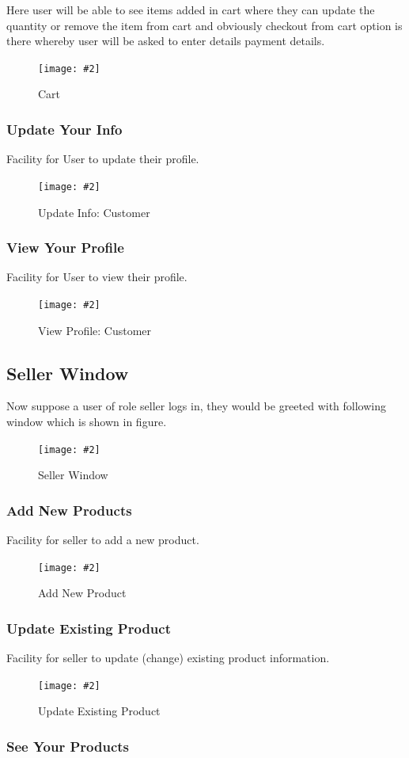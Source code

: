 \documentclass[a4paper,12pt]{article}
\newcommand{\iph}[2]{
    \texttt{[image: \#2]}
}
\newcommand{\dph}[3]{
\begin{figure}[H]
  \centering
  \iph{#1}{#2}
  \caption{#3}
\end{figure}
}
\begin{document}
Here user will be able to see items added in cart where they can update the quantity or remove the item from cart and obviously checkout from cart option is there whereby user will be asked to enter details payment details.

\dph{0.99}{cart}{Cart}

\subsubsection{Update Your Info}

Facility for User to update their profile.

\dph{0.99}{uppcust}{Update Info: Customer}

\subsubsection{View Your Profile}

Facility for User to view their profile.

\dph{0.79}{pcust}{View Profile: Customer}


\subsection{Seller Window}

Now suppose a user of role seller logs in, they would be greeted with following window which is shown in figure.

\dph{0.66}{seller}{Seller Window}


\subsubsection{Add New Products}

Facility for seller to add a new product.

\dph{0.99}{newprod}{Add New Product}

\subsubsection{Update Existing Product}

Facility for seller to update (change) existing product information.

\dph{0.95}{mprod}{Update Existing Product}

\subsubsection{See Your Products}
\end{document}
